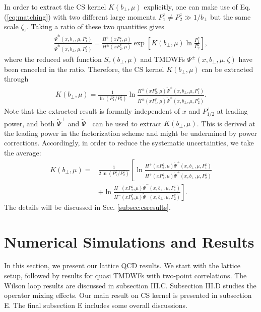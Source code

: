 \documentclass[prd,aps,twocolumn,preprintnumbers, showpacs, nofootinbib,superscriptaddress,notitlepage]{revtex4-1}
\begin{document}
In order to extract the CS kernel $K\left(b_{\perp}, \mu\right)$ explicitly, one  can make use of    Eq.(\ref{eq:matching}) with  two different large momenta $P_1^z\neq P_2^z\gg1/b_{\perp}$ but the same   scale $\zeta_z$. Taking a  ratio of these two quantities  gives 
\begin{align}
	\frac{\tilde \Psi^{\pm}(x, b_{\perp}, \mu,P_1^z)}{\tilde \Psi^{\pm}(x, b_{\perp}, \mu, P_2^z)}=\frac{H^{\pm}\left(xP_1^z,\mu \right)}{H^{\pm}\left(xP_2^z,\mu \right)}\exp\left[K(b_{\perp},\mu) \ln\frac{P_1^z}{P_2^z}\right], \label{eq:ratioofquasiWF}
\end{align}
where the reduced soft function $S_r(b_{\perp},\mu)$ and TMDWFs $\Psi^{\pm}(x,b_{\perp},\mu,\zeta)$  have been canceled in the ratio. Therefore, the CS kernel $K\left(b_{\perp}, \mu\right)$ can be extracted through 
\begin{align}
	K\left(b_{\perp}, \mu\right)=\frac{1}{\ln(P_1^z/P_2^z)} \ln\frac{H^{\pm}(xP_2^z,\mu)\tilde{\Psi}^{\pm}(x,b_{\perp},\mu,P_1^z)}{H^{\pm}(xP_1^z,\mu)\tilde{\Psi}^{\pm}(x,b_{\perp},\mu,P_2^z)}. \label{eq:extractingCSkernel}
\end{align}
Note that the extracted result is formally independent of $x$ and $P_{1/2}^z$ at leading power,  and both $\tilde{\Psi}^{+}$ and $\tilde{\Psi}^{-}$ can be used to extract $K\left(b_{\perp}, \mu\right)$.  This is derived at the leading power in the factorization scheme and  might be undermined by power corrections. Accordingly, in order  to reduce  the systematic uncertainties,  we take the average: 
 \begin{align}
	K\left(b_{\perp}, \mu\right)=&\frac{1}{2\ln(P_1^z/P_2^z)} \left[\ln\frac{H^{+}(xP_2^z,\mu)\tilde{\Psi}^{+}(x,b_{\perp},\mu,P_1^z)}{H^{+}(xP_1^z,\mu)\tilde{\Psi}^{+}(x,b_{\perp},\mu,P_2^z)}\right.  \nonumber\\
	&+\left.\ln\frac{H^{-}(xP_2^z,\mu)\tilde{\Psi}^{-}(x,b_{\perp},\mu,P_1^z)}{H^{-}(xP_1^z,\mu)\tilde{\Psi}^{-}(x,b_{\perp},\mu,P_2^z)}\right].
\end{align}
The details will be discussed in Sec. \ref{subsec:csresults}.

\section{Numerical Simulations and Results}
\label{sec:numerics}

In this section, we present our lattice QCD results. We start with the lattice setup, followed by results
for quasi TMDWFs with two-point correlations. 
The Wilson loop results are discussed in subsection III.C. Subsection III.D studies the operator mixing effects. Our main result on CS kernel is presented in subsection E. The final subsection E includes some overall discussions. 
\end{document}
